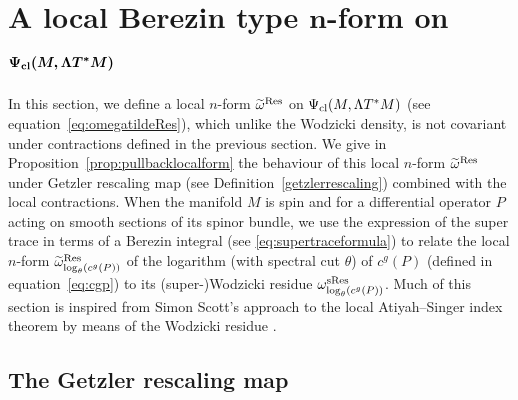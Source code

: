 \documentclass[pdftex]{sigma}
\numberwithin{equation}{section}
\theoremstyle{definition}
\begin{document}
\section[A local Berezin type n-form on Psi\_\{cl\} (M, Lambda T\^{}*M)]{A local Berezin type $\boldsymbol{n}$-form on $\boldsymbol{\Psi_{\rm cl} (M, \Lambda T^*M)}$}%

In this section, we define a local $n$-form $\widetilde \omega^{\rm Res}$ on $\Psi_{\rm cl} (M, \Lambda T^*M)$ (see equation~\eqref{eq:omegatildeRes}), which unlike the Wodzicki density, is not covariant under contractions defined in the previous section. We give in Proposition~\ref{prop:pullbacklocalform} the behaviour of this local $n$-form $\widetilde \omega^{\rm Res}$ under Getzler rescaling map
 (see Definition~\ref{getzlerrescaling}) combined with the local contractions. When the manifold $M$ is spin and for a differential operator $P$ acting on smooth sections of its spinor bundle, we use the expression of the super trace in terms of a Berezin integral (see \eqref{eq:supertraceformula}) to relate the local $n$-form $\widetilde \omega_{\log_\theta (c^g(P))}^{\rm Res}$ of the logarithm (with spectral cut $\theta$) of $c^g(P)$ (defined in equation~\eqref{eq:cgp}) to its (super-)Wodzicki residue $ \omega_{\log_\theta (c^g(P))}^{\rm sRes}$. Much of this section is inspired from Simon Scott's approach to the local Atiyah--Singer index theorem by means of the Wodzicki residue \cite[Section~3.5.3]{Sc}.

\subsection{The Getzler rescaling map}
\end{document}
